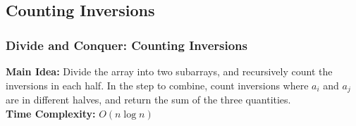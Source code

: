 \documentclass{beamer}
\begin{document}
\begin{frame}
\begin{center}
\end{center}
\end{frame}

\subsection{Counting Inversions}
\begin{frame}
    \frametitle{Divide and Conquer: Counting Inversions}
    \textbf{Main Idea:} Divide the array into two subarrays, and recursively count the inversions in each half. In the step to combine, count inversions where $a_i$ and $a_j$ are in different halves, and return the sum of the three quantities. \\[1em]
    \textbf{Time Complexity:} $O(n \log n)$
\end{frame}
\end{document}
